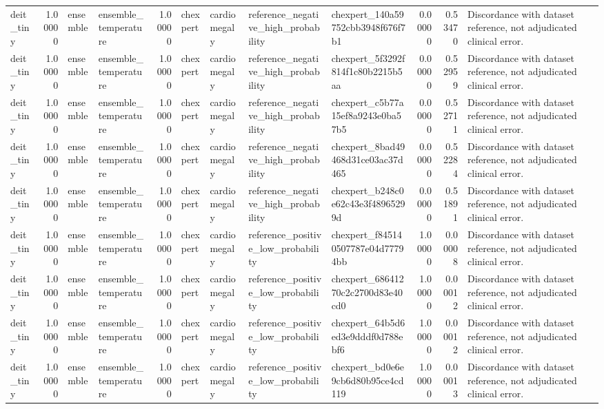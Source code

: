 \begin{tabular}{lrllrllllrrl}
deit\_tiny & 1.00000 & ensemble & ensemble\_temperature & 1.00000 & chexpert & cardiomegaly & reference\_negative\_high\_probability & chexpert\_140a59752cbb3948f676f7b1 & 0.00000 & 0.53470 & Discordance with dataset reference, not adjudicated clinical error. \\
deit\_tiny & 1.00000 & ensemble & ensemble\_temperature & 1.00000 & chexpert & cardiomegaly & reference\_negative\_high\_probability & chexpert\_5f3292f814f1c80b2215b5aa & 0.00000 & 0.52959 & Discordance with dataset reference, not adjudicated clinical error. \\
deit\_tiny & 1.00000 & ensemble & ensemble\_temperature & 1.00000 & chexpert & cardiomegaly & reference\_negative\_high\_probability & chexpert\_c5b77a15ef8a9243e0ba57b5 & 0.00000 & 0.52711 & Discordance with dataset reference, not adjudicated clinical error. \\
deit\_tiny & 1.00000 & ensemble & ensemble\_temperature & 1.00000 & chexpert & cardiomegaly & reference\_negative\_high\_probability & chexpert\_8bad49468d31ce03ac37d465 & 0.00000 & 0.52284 & Discordance with dataset reference, not adjudicated clinical error. \\
deit\_tiny & 1.00000 & ensemble & ensemble\_temperature & 1.00000 & chexpert & cardiomegaly & reference\_negative\_high\_probability & chexpert\_b248c0e62c43e3f48965299d & 0.00000 & 0.51891 & Discordance with dataset reference, not adjudicated clinical error. \\
deit\_tiny & 1.00000 & ensemble & ensemble\_temperature & 1.00000 & chexpert & cardiomegaly & reference\_positive\_low\_probability & chexpert\_f845140507787e04d77794bb & 1.00000 & 0.00008 & Discordance with dataset reference, not adjudicated clinical error. \\
deit\_tiny & 1.00000 & ensemble & ensemble\_temperature & 1.00000 & chexpert & cardiomegaly & reference\_positive\_low\_probability & chexpert\_68641270c2c2700d83e40cd0 & 1.00000 & 0.00012 & Discordance with dataset reference, not adjudicated clinical error. \\
deit\_tiny & 1.00000 & ensemble & ensemble\_temperature & 1.00000 & chexpert & cardiomegaly & reference\_positive\_low\_probability & chexpert\_64b5d6ed3e9dddf0d788ebf6 & 1.00000 & 0.00012 & Discordance with dataset reference, not adjudicated clinical error. \\
deit\_tiny & 1.00000 & ensemble & ensemble\_temperature & 1.00000 & chexpert & cardiomegaly & reference\_positive\_low\_probability & chexpert\_bd0e6e9cb6d80b95ce4cd119 & 1.00000 & 0.00013 & Discordance with dataset reference, not adjudicated clinical error. \\

\end{tabular}
